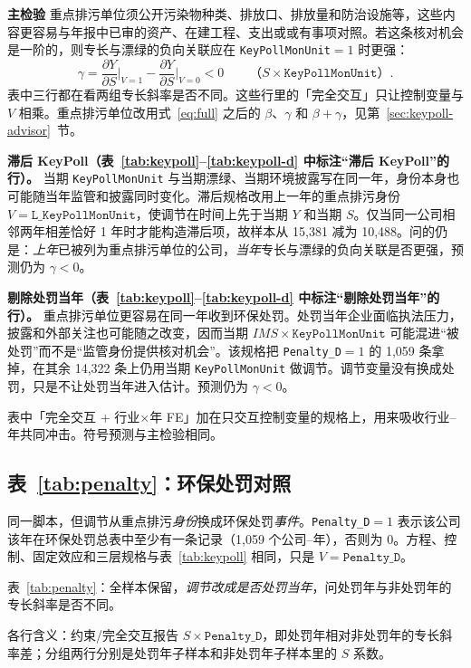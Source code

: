 \documentclass[11pt]{article}
\begin{document}
\textbf{主检验} 重点排污单位须公开污染物种类、排放口、排放量和防治设施等，这些内容更容易与年报中已审的资产、在建工程、支出或或有事项对照。若这条核对机会是一阶的，则专长与漂绿的负向关联应在 \texttt{KeyPollMonUnit}\(=1\) 时更强：
\[
\gamma=\frac{\partial Y}{\partial S}\Big|_{V=1}-\frac{\partial Y}{\partial S}\Big|_{V=0}<0
\qquad\text{（}S\times\texttt{KeyPollMonUnit}\text{）}.
\]
表中三行都在看两组专长斜率是否不同。这些行里的「完全交互」只让控制变量与 \(V\) 相乘。重点排污单位改用式~\eqref{eq:full} 之后的 \(\beta\)、\(\gamma\) 和 \(\beta+\gamma\)，见第~\ref{sec:keypoll-advisor}~节。

\textbf{滞后 KeyPoll（表~\ref{tab:keypoll}--\ref{tab:keypoll-d} 中标注``滞后 KeyPoll''的行）。}
当期 \texttt{KeyPollMonUnit} 与当期漂绿、当期环境披露写在同一年，身份本身也可能随当年监管和披露同时变化。滞后规格改用上一年的重点排污身份 \(V=\texttt{L\_KeyPollMonUnit}\)，使调节在时间上先于当期 \(Y\) 和当期 \(S\)。仅当同一公司相邻两年相差恰好 1 年时才能构造滞后项，故样本从 15,381 减为 10,488。问的仍是：\emph{上年}已被列为重点排污单位的公司，\emph{当年}专长与漂绿的负向关联是否更强，预测仍为 \(\gamma<0\)。

\textbf{剔除处罚当年（表~\ref{tab:keypoll}--\ref{tab:keypoll-d} 中标注``剔除处罚当年''的行）。}
重点排污单位更容易在同一年收到环保处罚。处罚当年企业面临执法压力，披露和外部关注也可能随之改变，因而当期 \(IMS\times\texttt{KeyPollMonUnit}\) 可能混进``被处罚''而不是``监管身份提供核对机会''。该规格把 \texttt{Penalty\_D}\(=1\) 的 1,059 条拿掉，在其余 14,322 条上仍用当期 \texttt{KeyPollMonUnit} 做调节。调节变量没有换成处罚，只是不让处罚当年进入估计。预测仍为 \(\gamma<0\)。

表中「完全交互 + 行业\(\times\)年 FE」加在只交互控制变量的规格上，用来吸收行业--年共同冲击。符号预测与主检验相同。

\subsection{表~\ref{tab:penalty}：环保处罚对照}

同一脚本，但调节从重点排污\emph{身份}换成环保处罚\emph{事件}。\texttt{Penalty\_D}\(=1\) 表示该公司该年在环保处罚总表中至少有一条记录（1,059 个公司--年），否则为 0。方程、控制、固定效应和三层规格与表~\ref{tab:keypoll} 相同，只是 \(V=\texttt{Penalty\_D}\)。

表~\ref{tab:penalty}：全样本保留，\emph{调节改成是否处罚当年}，问处罚年与非处罚年的专长斜率是否不同。


各行含义：约束/完全交互报告 \(S\times\texttt{Penalty\_D}\)，即处罚年相对非处罚年的专长斜率差；分组两行分别是处罚年子样本和非处罚年子样本里的 \(S\) 系数。
\end{document}
